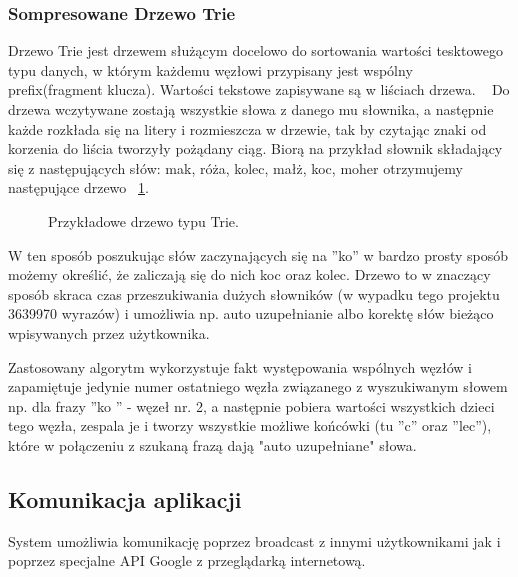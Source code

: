 \documentclass[twoside,a4paper]{book}
\begin{document}
\subsubsection{Sompresowane Drzewo Trie}  \label{sec:trie}
Drzewo Trie jest drzewem służącym docelowo do sortowania wartości tesktowego typu danych, w którym każdemu węzłowi przypisany jest  wspólny prefix(fragment klucza). Wartości tekstowe zapisywane są w liściach drzewa. ~\citep{trieTree}
Do drzewa wczytywane zostają wszystkie słowa z danego mu słownika, a następnie każde rozkłada się na litery i rozmieszcza w drzewie, tak by czytając znaki od korzenia do liścia tworzyły pożądany ciąg. Biorą na przykład słownik składający się z następujących słów: mak, róża, kolec, małż, koc, moher otrzymujemy następujące drzewo ~\ref{fig:trie}.
\begin{figure}[!h]
		\centering
		\caption{Przykładowe drzewo typu Trie. }
		\label{fig:trie}
\end{figure}
W ten sposób poszukując słów zaczynających się na ''ko'' w bardzo prosty sposób możemy określić, że zaliczają się do nich koc oraz kolec. 
Drzewo to w znaczący sposób skraca czas przeszukiwania dużych słowników (w wypadku tego projektu 3639970 wyrazów) i umożliwia np. auto uzupełnianie albo korektę słów bieżąco wpisywanych przez użytkownika.

Zastosowany algorytm wykorzystuje fakt występowania wspólnych węzłów i zapamiętuje jedynie numer ostatniego węzła związanego z wyszukiwanym słowem np. dla frazy ''ko
'' - węzeł nr. 2, a następnie pobiera wartości wszystkich dzieci tego węzła, zespala je i tworzy wszystkie możliwe końcówki (tu ''c'' oraz ''lec''), które w połączeniu z szukaną frazą dają "auto uzupełniane" słowa.
\subsection{Komunikacja aplikacji}
System umożliwia komunikację poprzez broadcast z innymi użytkownikami jak i poprzez specjalne API Google z przeglądarką internetową. 
\end{document}
